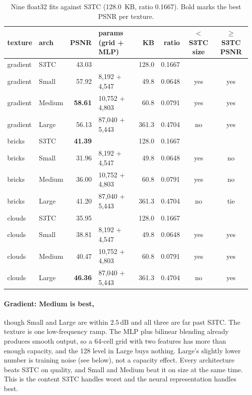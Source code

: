 \documentclass[11pt]{article}
\newcommand{\dB}{\,\mathrm{dB}}
\begin{document}
\begin{table}[H]
\centering
\small
\begin{tabular}{llrlrrcc}
\toprule
texture & arch & PSNR & params (grid + MLP) & KB & ratio & $<$ S3TC size & $\geq$ S3TC PSNR \\
\midrule
gradient & S3TC   & 43.03 & & 128.0 & 0.1667 & & \\
gradient & Small  & 57.92 & 8,192 + 4,547 & 49.8 & 0.0648 & yes & yes \\
gradient & Medium & \textbf{58.61} & 10,752 + 4,803 & 60.8 & 0.0791 & yes & yes \\
gradient & Large  & 56.13 & 87,040 + 5,443 & 361.3 & 0.4704 & no & yes \\
\midrule
bricks & S3TC   & \textbf{41.39} & & 128.0 & 0.1667 & & \\
bricks & Small  & 31.96 & 8,192 + 4,547 & 49.8 & 0.0648 & yes & no \\
bricks & Medium & 36.00 & 10,752 + 4,803 & 60.8 & 0.0791 & yes & no \\
bricks & Large  & 41.20 & 87,040 + 5,443 & 361.3 & 0.4704 & no & tie \\
\midrule
clouds & S3TC   & 35.95 & & 128.0 & 0.1667 & & \\
clouds & Small  & 38.81 & 8,192 + 4,547 & 49.8 & 0.0648 & yes & yes \\
clouds & Medium & 40.47 & 10,752 + 4,803 & 60.8 & 0.0791 & yes & yes \\
clouds & Large  & \textbf{46.36} & 87,040 + 5,443 & 361.3 & 0.4704 & no & yes \\
\bottomrule
\end{tabular}
\caption{Nine float32 fits against S3TC (128.0~KB, ratio 0.1667). Bold marks the best PSNR per texture.}
\end{table}

\paragraph{Gradient: Medium is best,} though Small and Large are within $2.5\dB$ and all three are far past S3TC. The texture is one low-frequency ramp. The MLP plus bilinear blending already produces smooth output, so a 64-cell grid with two features has more than enough capacity, and the 128 level in Large buys nothing. Large's slightly lower number is training noise (see below), not a capacity effect. Every architecture beats S3TC on quality, and Small and Medium beat it on size at the same time. This is the content S3TC handles worst and the neural representation handles best.
\end{document}
